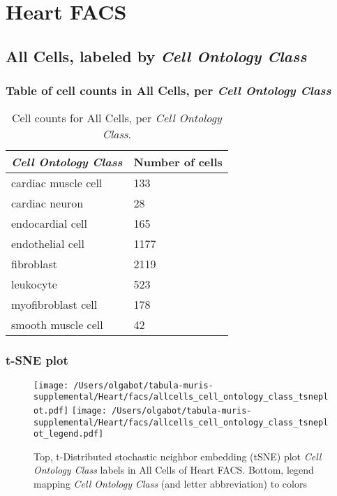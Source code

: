 \clearpage
\section{Heart FACS}

\subsection{All Cells, labeled by \emph{Cell Ontology Class}}
\subsubsection{Table of cell counts in All Cells, per \emph{Cell Ontology Class}}\begin{table}[h]
\centering
\label{my-label}
\begin{tabular}{@{}ll@{}}
\toprule

\emph{Cell Ontology Class}& Number of cells \\ \midrule
cardiac muscle cell & 133 \\

cardiac neuron & 28 \\

endocardial cell & 165 \\

endothelial cell & 1177 \\

fibroblast & 2119 \\

leukocyte & 523 \\

myofibroblast cell & 178 \\

smooth muscle cell & 42 \\
\bottomrule
\end{tabular}
\caption{Cell counts for All Cells, per \emph{Cell Ontology Class}.}
\end{table}

\clearpage
\subsubsection{t-SNE plot}
\begin{figure}[h]
\centering
\texttt{[image: /Users/olgabot/tabula-muris-supplemental/Heart/facs/allcells\_cell\_ontology\_class\_tsneplot.pdf]}
\texttt{[image: /Users/olgabot/tabula-muris-supplemental/Heart/facs/allcells\_cell\_ontology\_class\_tsneplot\_legend.pdf]}
\caption{Top, t-Distributed stochastic neighbor embedding (tSNE) plot  \emph{Cell Ontology Class} labels in All Cells of Heart FACS. Bottom, legend mapping \emph{Cell Ontology Class} (and letter abbreviation) to colors}
\end{figure}


